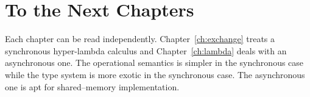 \section{To the Next Chapters}

Each chapter can be read independently.
Chapter~\ref{ch:exchange} treats a synchronous hyper-lambda calculus and
Chapter~\ref{ch:lambda} deals with an asynchronous one.
The operational semantics is simpler in the synchronous case while
the type system is more exotic in the synchronous case.
The asynchronous one is apt for shared--memory implementation.
